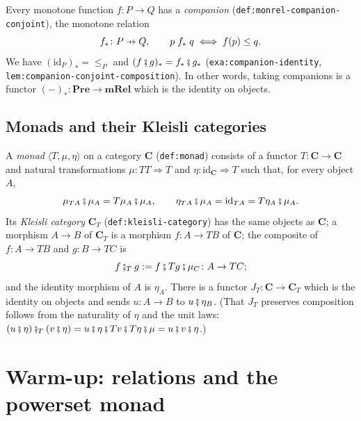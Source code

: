 \documentclass[11pt,a4paper]{article}
\theoremstyle{plain}
\theoremstyle{definition}
\theoremstyle{remark}
\newcommand{\Cat}[1]{\mathbf{#1}}
\newcommand{\Pre}{\Cat{Pre}}
\newcommand{\mRel}{\Cat{mRel}}
\newcommand{\then}{\mathbin{\fatsemi}}
\newcommand{\thenT}{\mathbin{\fatsemi_{T}}}
\newcommand{\tup}[1]{\langle #1 \rangle}
\newcommand{\profto}{\mathrel{\ooalign{\hfil$\mapstochar\mkern 5mu$\hfil\cr$\to$\cr}}}
\newcommand{\rel}[3]{#1 \mathrel{#2} #3}
\newcommand{\id}{\mathrm{id}}
\newcommand{\comp}[1]{#1_{*}}
\newcommand{\lbl}[1]{\nolinkurl{#1}}
\newcommand{\defeq}{\mathrel{:=}}
\begin{document}
Every monotone function $f \colon P \to Q$ has a \emph{companion} (\lbl{def:monrel-companion-conjoint}), the monotone relation
\begin{equation}
    \label{eq:companion}
    \comp{f} \colon P \profto Q,
    \qquad
    \rel{p}{\comp{f}}{q} \iff f(p) \leq q.
\end{equation}
We have $\comp{(\id_P)} = {\leq_P}$ and $\comp{(f \then g)} = \comp{f} \then \comp{g}$ (\lbl{exa:companion-identity}, \lbl{lem:companion-conjoint-composition}).
In other words, taking companions is a functor $\comp{(-)} \colon \Pre \to \mRel$ which is the identity on objects.

\subsection{Monads and their Kleisli categories}

A \emph{monad} $\tup{T, \mu, \eta}$ on a category $\Cat{C}$ (\lbl{def:monad}) consists of a functor $T \colon \Cat{C} \to \Cat{C}$ and natural transformations $\mu \colon TT \Rightarrow T$ and $\eta \colon \id_{\Cat{C}} \Rightarrow T$ such that, for every object $A$,
\begin{equation}
    \label{eq:monad-laws}
    \mu_{TA} \then \mu_A = T\mu_A \then \mu_A,
    \qquad
    \eta_{TA} \then \mu_A = \id_{TA} = T\eta_A \then \mu_A.
\end{equation}
Its \emph{Kleisli category} $\Cat{C}_T$ (\lbl{def:kleisli-category}) has the same objects as $\Cat{C}$; a morphism $A \to B$ of $\Cat{C}_T$ is a morphism $f \colon A \to TB$ of $\Cat{C}$; the composite of $f \colon A \to TB$ and $g \colon B \to TC$ is
\begin{equation}
    \label{eq:kleisli-composition}
    f \thenT g \defeq f \then Tg \then \mu_C \colon A \to TC;
\end{equation}
and the identity morphism of $A$ is $\eta_A$.
There is a functor $J_T \colon \Cat{C} \to \Cat{C}_T$ which is the identity on objects and sends $u \colon A \to B$ to $u \then \eta_B$.
(That $J_T$ preserves composition follows from the naturality of $\eta$ and the unit laws: $(u \then \eta) \thenT (v \then \eta) = u \then \eta \then T v \then T\eta \then \mu = u \then v \then \eta$.)

\section{Warm-up: relations and the powerset monad}
\label{sec:warm-up}
\end{document}
